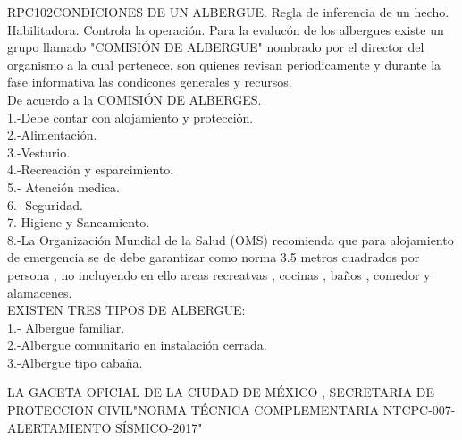 \begin{BusinessRule}{RPC102}{CONDICIONES DE UN ALBERGUE.}{
		Regla de inferencia de un hecho.
	}{
		Habilitadora. 
	}{
		Controla la operación. %
	}
	\BRItem[Descripción:] Para la evalucón de los albergues existe un grupo llamado "COMISIÓN DE ALBERGUE" nombrado por el director del organismo a la cual pertenece, son quienes revisan periodicamente y durante la fase informativa las condicones generales y recursos.\\De acuerdo a la COMISIÓN DE ALBERGES.\\1.-Debe contar con alojamiento y protección.\\2.-Alimentación.\\3.-Vesturio.\\4.-Recreación y esparcimiento.\\5.- Atención medica.\\6.- Seguridad.\\7.-Higiene y Saneamiento.\\8.-La Organización Mundial de la Salud (OMS) recomienda que para alojamiento de emergencia se de debe garantizar como norma 3.5 metros cuadrados por persona , no incluyendo en ello areas recreatvas , cocinas , baños , comedor y alamacenes.\\EXISTEN TRES TIPOS DE ALBERGUE:\\1.- Albergue familiar.\\2.-Albergue comunitario en instalación cerrada.\\3.-Albergue tipo cabaña. 
	
	
	 LA GACETA OFICIAL DE LA CIUDAD DE MÉXICO , SECRETARIA DE PROTECCION CIVIL"NORMA TÉCNICA COMPLEMENTARIA NTCPC-007-ALERTAMIENTO SÍSMICO-2017"
\end{BusinessRule}